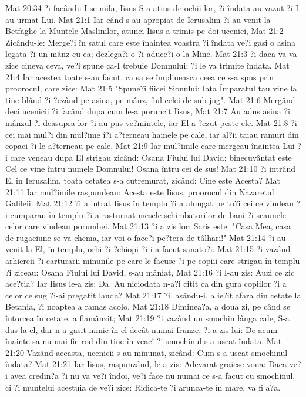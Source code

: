 Mat 20:34  ?i facându-I-se mila, Iisus S-a atins de ochii lor, ?i îndata au vazut ?i I-au urmat Lui.
Mat 21:1  Iar când s-au apropiat de Ierusalim ?i au venit la Betfaghe la Muntele Maslinilor, atunci Iisus a trimis pe doi ucenici,
Mat 21:2  Zicându-le: Merge?i în satul care este înaintea voastra ?i îndata ve?i gasi o asina legata ?i un mânz cu ea; dezlega?i-o ?i aduce?i-o la Mine.
Mat 21:3  ?i daca va va zice cineva ceva, ve?i spune ca-I trebuie Domnului; ?i le va trimite îndata.
Mat 21:4  Iar acestea toate s-au facut, ca sa se împlineasca ceea ce s-a spus prin proorocul, care zice:
Mat 21:5  "Spune?i fiicei Sionului: Iata Împaratul tau vine la tine blând ?i ?ezând pe asina, pe mânz, fiul celei de sub jug".
Mat 21:6  Mergând deci ucenicii ?i facând dupa cum le-a poruncit Iisus,
Mat 21:7  Au adus asina ?i mânzul ?i deasupra lor ?i-au pus ve?mintele, iar El a ?ezut peste ele.
Mat 21:8  ?i cei mai mul?i din mul?ime î?i a?terneau hainele pe cale, iar al?ii taiau ramuri din copaci ?i le a?terneau pe cale,
Mat 21:9  Iar mul?imile care mergeau înaintea Lui ?i care veneau dupa El strigau zicând: Osana Fiului lui David; binecuvântat este Cel ce vine întru numele Domnului! Osana întru cei de sus!
Mat 21:10  ?i intrând El în Ierusalim, toata cetatea s-a cutremurat, zicând: Cine este Acesta?
Mat 21:11  Iar mul?imile raspundeau: Acesta este Iisus, proorocul din Nazaretul Galileii.
Mat 21:12  ?i a intrat Iisus în templu ?i a alungat pe to?i cei ce vindeau ?i cumparau în templu ?i a rasturnat mesele schimbatorilor de bani ?i scaunele celor care vindeau porumbei.
Mat 21:13  ?i a zis lor: Scris este: "Casa Mea, casa de rugaciune se va chema, iar voi o face?i pe?tera de tâlhari!"
Mat 21:14  ?i au venit la El, în templu, orbi ?i ?chiopi ?i i-a facut sanato?i.
Mat 21:15  ?i vazând arhiereii ?i carturarii minunile pe care le facuse ?i pe copiii care strigau în templu ?i ziceau: Osana Fiului lui David, s-au mâniat,
Mat 21:16  ?i I-au zis: Auzi ce zic ace?tia? Iar Iisus le-a zis: Da. Au niciodata n-a?i citit ca din gura copiilor ?i a celor ce sug ?i-ai pregatit lauda?
Mat 21:17  ?i lasându-i, a ie?it afara din cetate la Betania, ?i noaptea a ramas acolo.
Mat 21:18  Diminea?a, a doua zi, pe când se întorcea în cetate, a flamânzit;
Mat 21:19  ?i vazând un smochin lânga cale, S-a dus la el, dar n-a gasit nimic în el decât numai frunze, ?i a zis lui: De acum înainte sa nu mai fie rod din tine în veac! ?i smochinul s-a uscat îndata.
Mat 21:20  Vazând aceasta, ucenicii s-au minunat, zicând: Cum s-a uscat smochinul îndata?
Mat 21:21  Iar Iisus, raspunzând, le-a zis: Adevarat graiesc voua: Daca ve?i avea credin?a ?i nu va ve?i îndoi, ve?i face nu numai ce s-a facut cu smochinul, ci ?i muntelui acestuia de ve?i zice: Ridica-te ?i arunca-te în mare, va fi a?a.
